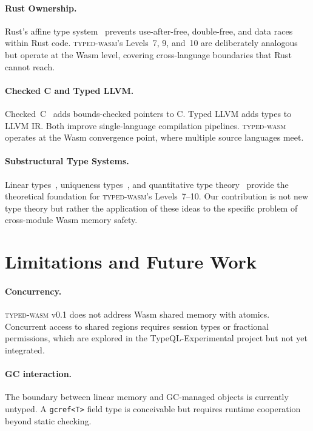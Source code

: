 \documentclass[11pt,a4paper]{article}
\newcommand{\typedwasm}{\textsc{typed-wasm}}
\begin{document}
\paragraph{Rust Ownership.}
Rust's affine type system~\cite{jung2018} prevents use-after-free,
double-free, and data races within Rust code.  \typedwasm{}'s Levels~7,
9, and~10 are deliberately analogous but operate at the Wasm level,
covering cross-language boundaries that Rust cannot reach.

\paragraph{Checked C and Typed LLVM.}
Checked~C~\cite{elliott2018} adds bounds-checked pointers to C.
Typed LLVM adds types to LLVM IR.  Both improve single-language
compilation pipelines.  \typedwasm{} operates at the Wasm convergence
point, where multiple source languages meet.

\paragraph{Substructural Type Systems.}
Linear types~\cite{wadler1990}, uniqueness types~\cite{barendsen1996},
and quantitative type theory~\cite{atkey2018} provide the theoretical
foundation for \typedwasm{}'s Levels~7--10.  Our contribution is not new
type theory but rather the application of these ideas to the specific
problem of cross-module Wasm memory safety.

\section{Limitations and Future Work}
\label{sec:limitations}

\paragraph{Concurrency.}
\typedwasm{} v0.1 does not address Wasm shared memory with atomics.
Concurrent access to shared regions requires session types or fractional
permissions, which are explored in the TypeQL-Experimental project but
not yet integrated.

\paragraph{GC interaction.}
The boundary between linear memory and GC-managed objects is currently
untyped.  A \lstinline{gcref<T>} field type is conceivable but requires
runtime cooperation beyond static checking.
\end{document}
